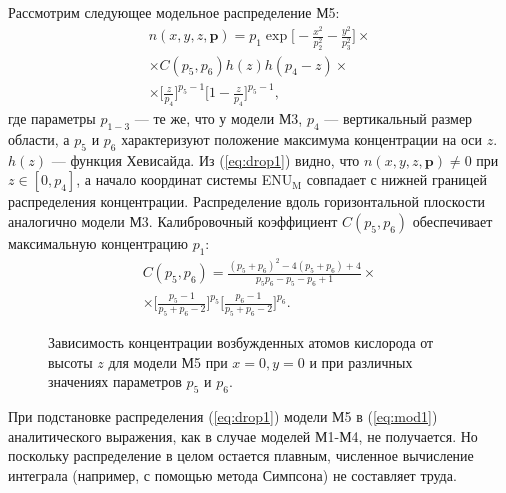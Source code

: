 \documentclass[12pt,a4paper]{article}
\renewcommand{\vec}{\mathbf}
\begin{document}
Рассмотрим следующее модельное распределение М5:
\begin{equation}\label{eq:drop1}
\begin{split}
n(x,y,z,\vec{p})=p_1 \exp{\bigg[-\frac{x^2}{p_2^2}-\frac{y^2}{p_3^2}\bigg]} \times \\
\times C(p_5,p_6) h(z) h(p_4-z) \times \\
\times \bigg[\frac{z}{p_4}\bigg]^{p_5-1}
\bigg[1-\frac{z}{p_4}\bigg]^{p_5-1},
\end{split}
\end{equation}
где параметры $p_{1-3}$ --- те же, что у модели М3, $p_4$ --- вертикальный размер области, а $p_5$ и $p_6$ характеризуют положение максимума концентрации на оси $z$. $h(z)$ --- функция Хевисайда. Из (\ref{eq:drop1}) видно, что $n(x,y,z,\vec{p})\neq 0$ при $z\in [0,p_4]$, а начало координат системы ENU$_\text{M}$ совпадает с нижней границей распределения концентрации. Распределение вдоль горизонтальной плоскости аналогично модели М3. Калибровочный коэффициент $C(p_5,p_6)$ обеспечивает максимальную концентрацию $p_1$:
\begin{equation}\label{eq:drop2}
\begin{split}
C(p_5,p_6)=\frac{(p_5+p_6)^2 -4(p_5+p_6)+4 }{p_5p_6-p_5-p_6+1} \times \\
\times \bigg[ \frac{p_5-1}{p_5+p_6-2}  \bigg] ^{p_5}
\bigg[ \frac{p_6-1}{p_5+p_6-2}  \bigg] ^{p_6}.
\end{split}
\end{equation}

\begin{figure}[h]
	\caption{Зависимость концентрации возбужденных атомов кислорода от высоты $z$ для модели М5 при $x=0, y=0$ и при различных значениях параметров $p_5$ и $p_6$.}
	\label{fig:fig6}
\end{figure}

При подстановке распределения (\ref{eq:drop1}) модели М5 в (\ref{eq:mod1}) аналитического выражения, как в случае моделей М1-М4, не получается. Но поскольку распределение в целом остается плавным, численное вычисление интеграла (например, с помощью метода Симпсона) не составляет труда.  
\end{document}
